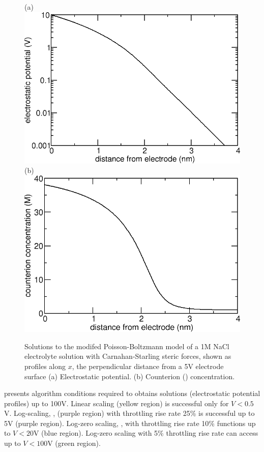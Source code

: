 \begin{figure}
\centering
(a)
\includegraphics[width=0.4\linewidth]{graphics/steric_potential_10V.png}
(b)
\includegraphics[width=0.4\linewidth]{graphics/steric_10V_counterion.png}
\caption{\label{fig_results_throttling}Solutions to the modifed
  Poisson-Boltzmann model of a 1M NaCl electrolyte solution with
  Carnahan-Starling steric forces, shown as profiles along $x$, the
  perpendicular distance from a 5V electrode surface (a) Electrostatic
  potential. (b) Counterion () concentration. }
\end{figure}

 presents algorithm conditions required
to obtains solutions (electrostatic potential profiles) up to
100V. Linear scaling (yellow region) is successful only for
$V<0.5$V. Log-scaling, , (purple region) with
throttling rise rate 25\% is successful up to 5V (purple
region). Log-zero scaling, , with throttling rise
rate 10\% functions up to $V<20$V (blue region). Log-zero scaling with
5\% throttling rise rate can access up to $V<100$V (green region).

